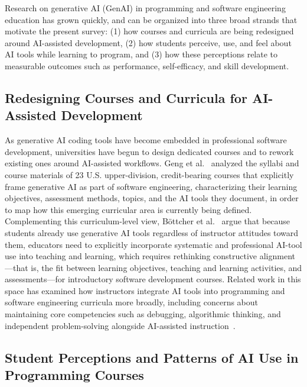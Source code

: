 \documentclass[sigconf]{acmart}
\begin{document}
Research on generative AI (GenAI) in programming and software engineering
education has grown quickly, and can be organized into three broad strands that
motivate the present survey: (1) how courses and curricula are being redesigned
around AI-assisted development, (2) how students perceive, use, and feel about
AI tools while learning to program, and (3) how these perceptions relate to
measurable outcomes such as performance, self-efficacy, and skill development.

\subsection{Redesigning Courses and Curricula for AI-Assisted Development}

As generative AI coding tools have become embedded in professional software
development, universities have begun to design dedicated courses and to rework
existing ones around AI-assisted workflows. Geng et al.~\cite{geng2026mapping}
analyzed the syllabi and course materials of 23 U.S. upper-division,
credit-bearing courses that explicitly frame generative AI as part of software
engineering, characterizing their learning objectives, assessment methods,
topics, and the AI tools they document, in order to map how this emerging
curricular area is currently being defined. Complementing this curriculum-level
view, B\"ottcher et al.~\cite{bottcher2025concepts} argue that because students
already use generative AI tools regardless of instructor attitudes toward them,
educators need to explicitly incorporate systematic and professional AI-tool
use into teaching and learning, which requires rethinking constructive
alignment---that is, the fit between learning objectives, teaching and learning
activities, and assessments---for introductory software development courses.
Related work in this space has examined how instructors integrate AI tools into
programming and software engineering curricula more broadly, including concerns
about maintaining core competencies such as debugging, algorithmic thinking,
and independent problem-solving alongside AI-assisted
instruction~\cite{kohenvacs2025integrating}.

\subsection{Student Perceptions and Patterns of AI Use in Programming Courses}
\end{document}
